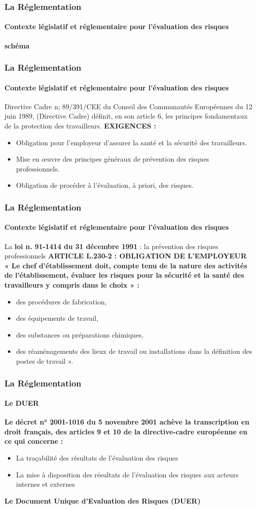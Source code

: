 \documentclass{beamer}
\begin{document}
\begin{frame}
\frametitle{La Réglementation}
\framesubtitle{Contexte législatif et réglementaire pour l’évaluation des risques}
\textbf{schéma}
\end{frame}

\begin{frame}
\frametitle{La Réglementation}
\framesubtitle{Contexte législatif et réglementaire pour l’évaluation des risques}
Directive Cadre n; 89/391/CEE du Conseil des Communautés Européennes du 12 juin 1989, (Directive Cadre) définit, en son article 6, les principes fondamentaux de la protection des travailleurs.
\textbf{EXIGENCES :}
\begin{itemize}
\item Obligation pour l’employeur d’assurer la santé et la sécurité des travailleurs.
\item Mise en œuvre des principes généraux de prévention des risques professionnels.
\item Obligation de procéder à l’évaluation, à priori, des risques.
\end{itemize}
\end{frame}

\begin{frame}
\frametitle{La Réglementation}
\framesubtitle{Contexte législatif et réglementaire pour l’évaluation des risques}
La \textbf{loi n. 91-1414  du 31 décembre 1991} : la prévention des risques professionnels
\textbf{ARTICLE L.230-2 : OBLIGATION DE L’EMPLOYEUR}
\textbf{« Le chef d’établissement doit, compte tenu de la nature des activités de l’établissement, évaluer les risques pour la sécurité et la santé des travailleurs y compris dans le choix » :}
\begin{itemize}
\item des procédures de fabrication,
\item des équipements de travail,
\item des substances ou préparations chimiques,
\item des réaménagements des lieux de travail ou installations dans la définition des postes de travail ».
\end{itemize}
\end{frame}

\begin{frame}
\frametitle{La Réglementation}
\framesubtitle{Le DUER}
\textbf{Le décret n° 2001-1016  du 5 novembre 2001 achève la transcription en droit français, des articles 9 et 10 de 
la directive-cadre européenne en ce qui concerne :}
\begin{itemize}
\item La traçabilité des résultats de l’évaluation des risques
\item La mise à disposition des résultats de l’évaluation des risques aux acteurs internes et externes
\end{itemize}
\textbf{Le Document Unique d’Evaluation des Risques (DUER)}
\end{frame}
\end{document}
